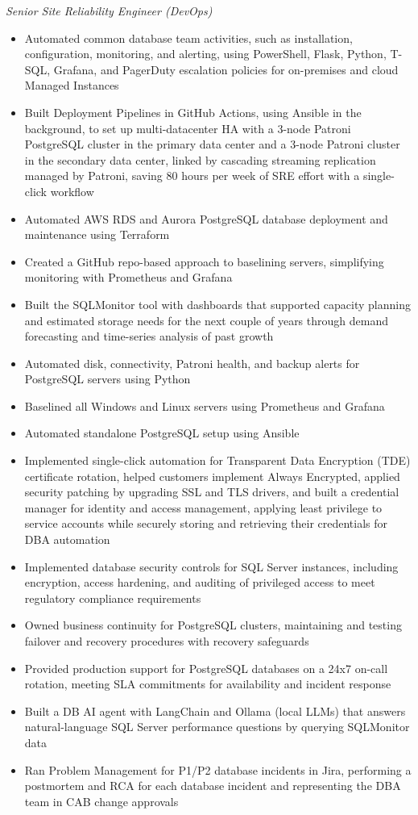 \documentclass[10pt,a4paper]{article}
\begin{document}
\textit{Senior Site Reliability Engineer (DevOps)}\\[-5pt]
\begin{itemize}
  \item Automated common database team activities, such as installation, configuration, monitoring, and alerting, using PowerShell, Flask, Python, T-SQL, Grafana, and PagerDuty escalation policies for on-premises and cloud Managed Instances
  \item Built Deployment Pipelines in GitHub Actions, using Ansible in the background, to set up multi-datacenter HA with a 3-node Patroni PostgreSQL cluster in the primary data center and a 3-node Patroni cluster in the secondary data center, linked by cascading streaming replication managed by Patroni, saving 80 hours per week of SRE effort with a single-click workflow
  \item Automated AWS RDS and Aurora PostgreSQL database deployment and maintenance using Terraform
  \item Created a GitHub repo-based approach to baselining servers, simplifying monitoring with Prometheus and Grafana
  \item Built the SQLMonitor tool with dashboards that supported capacity planning and estimated storage needs for the next couple of years through demand forecasting and time-series analysis of past growth
  \item Automated disk, connectivity, Patroni health, and backup alerts for PostgreSQL servers using Python
  \item Baselined all Windows and Linux servers using Prometheus and Grafana
  \item Automated standalone PostgreSQL setup using Ansible
  \item Implemented single-click automation for Transparent Data Encryption (TDE) certificate rotation, helped customers implement Always Encrypted, applied security patching by upgrading SSL and TLS drivers, and built a credential manager for identity and access management, applying least privilege to service accounts while securely storing and retrieving their credentials for DBA automation
  \item Implemented database security controls for SQL Server instances, including encryption, access hardening, and auditing of privileged access to meet regulatory compliance requirements
  \item Owned business continuity for PostgreSQL clusters, maintaining and testing failover and recovery procedures with recovery safeguards
  \item Provided production support for PostgreSQL databases on a 24x7 on-call rotation, meeting SLA commitments for availability and incident response
  \item Built a DB AI agent with LangChain and Ollama (local LLMs) that answers natural-language SQL Server performance questions by querying SQLMonitor data
  \item Ran Problem Management for P1/P2 database incidents in Jira, performing a postmortem and RCA for each database incident and representing the DBA team in CAB change approvals
\end{itemize}
\end{document}
